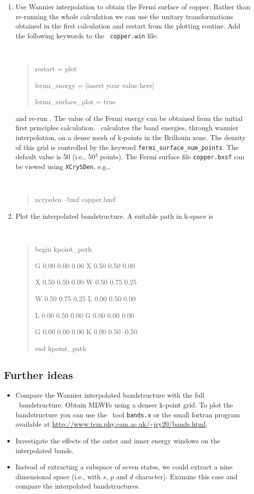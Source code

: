 \documentclass[a4paper,11pt,twoside]{article}
\begin{document}
\begin{enumerate}
\item Use Wannier interpolation to obtain the Fermi surface of
  copper. Rather than re-running the whole calculation we can use the
  unitary transformations obtained in the first calculation and restart
  from the plotting routine. Add the following keywords to the {\tt
    copper.win} file:
{\tt
\begin{quote}
restart = plot

fermi\_energy = [insert your value here] 

fermi\_surface\_plot = true
\end{quote} } and re-run \wannier. The value of the Fermi energy can
be obtained from the initial first principles calculation. \wannier\
calculates the band energies, through wannier interpolation, on a
dense mesh of k-points in the Brillouin zone. The density of this grid
is controlled by the keyword {\tt fermi\_surface\_num\_points}. The
default value is 50 (i.e., 50$^3$ points).  The Fermi surface file
{\tt copper.bxsf} can be viewed using {\tt XCrySDen}, e.g.,
%
{\tt
\begin{quote}
xcrysden --bxsf copper.bxsf
\end{quote} }


\item Plot the interpolated bandstructure. A suitable path in k-space is
\smallskip
{\tt
\begin{quote}
begin kpoint\_path

G 0.00  0.00  0.00    X 0.50  0.50  0.00

X 0.50  0.50  0.00    W 0.50  0.75  0.25

W 0.50  0.75  0.25    L 0.00  0.50  0.00

L 0.00  0.50  0.00    G 0.00  0.00  0.00

G 0.00  0.00  0.00    K 0.00  0.50 -0.50
 
end kpoint\_path
\end{quote} }
\end{enumerate}

\subsection*{Further ideas}
\begin{itemize}
\item Compare the Wannier interpolated bandstructure with the full
  \pwscf\ bandstructure. Obtain MLWFs using a denser k-point grid.
To plot the bandstructure you can use the \pwscf\ tool {\tt bands.x} or the small fortran program available at \url{http://www.tcm.phy.cam.ac.uk/~jry20/bands.html}.
\item Investigate the effects of the outer and inner energy windows on
  the interpolated bands. 
\item Instead of extracting a subspace of seven states, we could
  extract a nine dimensional space (i.e., with $s$, $p$ and $d$
  character). Examine this case and compare the interpolated
  bandstructures.
\end{itemize}
\end{document}
